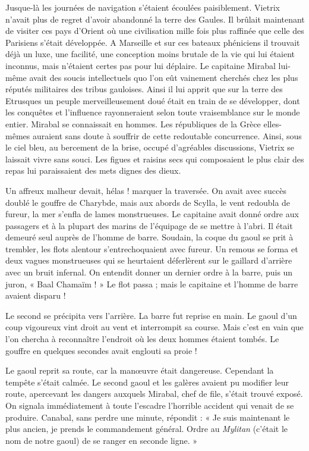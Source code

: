 \documentclass[a4paper, 11pt, oneside, polutonikogreek, french]{article}
\begin{document}
Jusque-là les journées de navigation s'étaient écoulées paisiblement. Vietrix n'avait plus de regret d'avoir abandonné la terre des Gaules. Il brûlait maintenant de visiter ces pays d'Orient où une civilisation mille fois plus raffinée que celle des Parisiens s'était développée. A Marseille et sur ces bateaux phéniciens il trouvait déjà un luxe, une facilité, une conception moins brutale de la vie qui lui étaient inconnus, mais n'étaient certes pas pour lui déplaire. Le capitaine Mirabal lui-même avait des soucis intellectuels quo l'on eût vainement cherchés chez les plus réputés militaires des tribus gauloises. Ainsi il lui apprit que sur la terre des Etrusques un peuple merveilleusement doué était en train de se développer, dont les conquêtes et l'influence rayonneraient selon toute vraisemblance sur le monde entier. Mirabal se connaissait en hommes. Les républiques de la Grèce elles-mêmes auraient sans doute à souffrir de cette redoutable concurrence. Ainsi, sous le ciel bleu, au bercement de la brise, occupé d'agréables discussions, Vietrix se laissait vivre sans souci. Les figues et raisins secs qui composaient le plus clair des repas lui paraissaient des mets dignes des dieux.

\bigskip
\centerline{\EightStarTaper}
\centerline{\EightStarTaper\EightStarTaper}
\bigskip

Un affreux malheur devait, hélas ! marquer la traversée. On avait avec succès doublé le gouffre de Charybde, mais aux abords de Scylla, le vent redoubla de fureur, la mer s'enfla de lames monstrueuses. Le capitaine avait donné ordre aux passagers et à la plupart des marins de l'équipage de se mettre à l'abri. Il était demeuré seul auprès de l'homme de barre. Soudain, la coque du gaoul se prit à trembler, les flots alentour s'entrechoquaient avec fureur. Un remous se forma et deux vagues monstrueuses qui se heurtaient déferlèrent sur le gaillard d'arrière avec un bruit infernal. On entendit donner un dernier ordre à la barre, puis un juron, « Baal Chamaïm ! » Le flot passa ; mais le capitaine et l'homme de barre avaient disparu !

Le second se précipita vers l'arrière. La barre fut reprise en main. Le gaoul d'un coup vigoureux vint droit au vent et interrompit sa course. Mais c'est en vain que l'on chercha à reconnaître l'endroit où les deux hommes étaient tombés. Le gouffre en quelques secondes avait englouti sa proie !

Le gaoul reprit sa route, car la manœuvre était dangereuse. Cependant la tempête s'était calmée. Le second gaoul et les galères avaient pu modifier leur route, apercevant les dangers auxquels Mirabal, chef de file, s'était trouvé exposé. On signala immédiatement à toute l'escadre l'horrible accident qui venait de se produire. Canabal, sans perdre une minute, répondit : « Je suis maintenant le plus ancien, je prends le commandement général. Ordre au \emph{Mylitan} (c'était le nom de notre gaoul) de se ranger en seconde ligne. »
\end{document}
